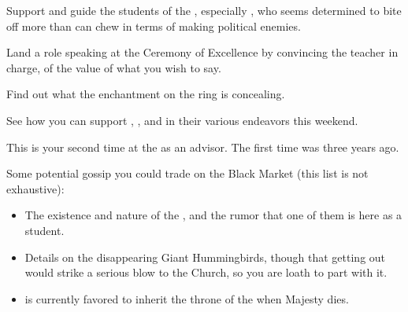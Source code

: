\documentclass[char]{GL2020}
\begin{document}
\begin{itemz}
    \item Support and guide the students of the \pFarm{}, especially \cLibAssist{}, who seems determined to bite off more than \cLibAssist{\they} can chew in terms of making political enemies.
    \item Land a role speaking at the Ceremony of Excellence by convincing the teacher in charge, \cMusic{} of the value of what you wish to say.
    \item Find out what the enchantment on the ring is concealing.
    \item See how you can support \cWildCard{}, \cPrince{}, and \cAntiChup{} in their various endeavors this weekend.
\end{itemz}

\begin{itemz}[Notes]
    \item This is your second time at the \pSchool{} as an advisor. The first time was three years ago.
    \item Some potential gossip you could trade on the Black Market (this list is not exhaustive):
    \begin{itemize}
   	 \item The existence and nature of the \cDisneySect{}, and the rumor that one of them is here as a student.
   	 \item Details on the disappearing Giant Hummingbirds, though that getting out would strike a serious blow to the Church, so you are loath to part with it.
   	 \item \cPrince{} is currently favored to inherit the throne of the \pFarm{} when \cQueen{\Their} Majesty dies.
    \end{itemize}
\end{itemz}
\end{document}
